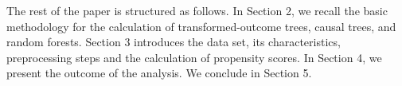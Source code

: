 The rest of the paper is structured as follows. In Section 2, we recall the basic methodology for the calculation of transformed-outcome trees, causal trees, and random forests.  Section 3 introduces the data set, its characteristics, preprocessing steps and the calculation of propensity scores. In Section 4, we present the outcome of the analysis. We conclude in Section 5.
%

